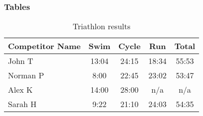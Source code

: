 \begin{frame}
\frametitle{Tables}
\begin{table}
\begin{tabular}{l | c | c | c | c }
Competitor Name & Swim & Cycle & Run & Total \\
\hline \hline
John T & 13:04 & 24:15 & 18:34 & 55:53  \\ 
Norman P & 8:00 & 22:45 & 23:02 & 53:47 \\
Alex K & 14:00 & 28:00 & n/a & n/a \\
Sarah H & 9:22 & 21:10 & 24:03 & 54:35 
\end{tabular}
\caption{Triathlon results}
\end{table}
\end{frame}

